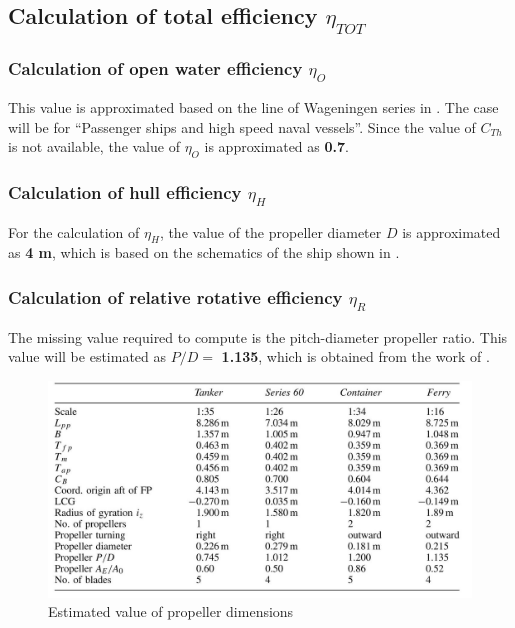 \pagebreak

\subsection{Calculation of total efficiency $\eta_{TOT}$}\label{sec:eta_tot_method}

\subsubsection*{Calculation of open water efficiency $\eta_O$}

This value is approximated based on the line of Wageningen series in  . The case will be for ``Passenger ships and high speed naval vessels''. Since the value of $C_{Th}$ is not available, the value of $\eta_O$ is approximated as \textbf{0.7}.

\subsubsection*{Calculation of hull efficiency $\eta_H$}

For the calculation of $\eta_H$, the value of the propeller diameter $D$ is approximated as \textbf{4 m}, which is based on the schematics of the ship shown in .

\subsubsection*{Calculation of relative rotative efficiency $\eta_R$}

The missing value required to compute  is the pitch-diameter propeller ratio. This value will be estimated as $P/D =$ \textbf{1.135}, which is obtained from the work of .

\begin{figure}[h]
    \centering
        \includegraphics[width=.95\textwidth]{02_figures/betram_wolff_ratiomodel .jpg}
        \caption{Estimated value of propeller dimensions }
        \label{fig:betram_wolff_propellerdimensions}
\end{figure}

